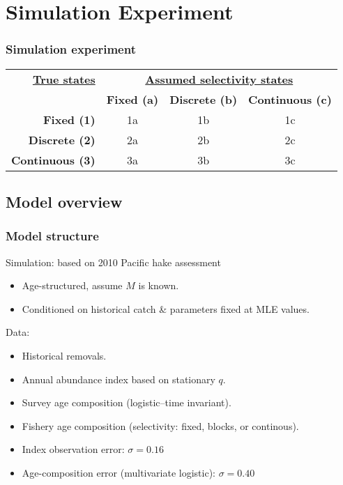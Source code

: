\documentclass{beamer}
\begin{document}
\section{Simulation Experiment} %
\label{sec:simulation_experiment}


\begin{frame}[m]\frametitle{Simulation experiment}
    
 \begin{tabular}{r|ccc}
		\hline

		\textbf{\textbf{\underline{True states}}}
		&\multicolumn{3}{c}{\textbf{\underline{Assumed selectivity states}}}\\
		&\textbf{Fixed (a)} & \textbf{Discrete (b)} & \textbf{Continuous (c)} \\
		\hline
		 \textbf{Fixed (1)}      & 1a & 1b & 1c \\
		 \textbf{Discrete (2)}   & 2a & 2b & 2c \\
		 \textbf{Continuous (3)} & 3a & 3b & 3c \\
		\hline


		\hline
		\end{tabular}
\end{frame}
\subsection{Model overview} %
\label{sub:model_overview}

\begin{frame}[t]\frametitle{Model structure}
	Simulation: based on 2010 Pacific hake assessment
    \begin{itemize}
    	\item Age-structured, assume $M$ is known.
    	\item Conditioned on historical catch \& parameters fixed at MLE values.
    \end{itemize}
    \vfill
    Data:
    \begin{itemize}
    	\item Historical removals.
    	\item Annual abundance index based on stationary $q$.
    	\item Survey age composition (logistic--time invariant).
    	\item Fishery age composition (selectivity: fixed, blocks, or continous).
    	\item Index observation error: $\sigma = 0.16$
    	\item Age-composition error (multivariate logistic): $\sigma = 0.40$
    \end{itemize}
\end{frame}
\end{document}
